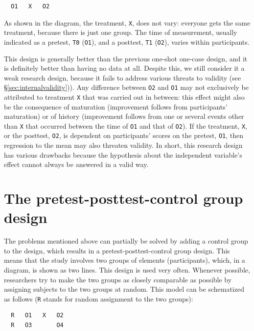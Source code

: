 \documentclass[
]{book}
\begin{document}
\begin{verbatim}
  O1   X   O2
\end{verbatim}

As shown in the diagram, the treatment, \texttt{X}, does not vary: everyone gets the same treatment, because there is just one group. The time of measurement, usually indicated as a pretest, \texttt{T0} (\texttt{O1}), and a posttest, \texttt{T1} (\texttt{O2}), varies within participants.

This design is generally better than the previous one-shot one-case design, and it is definitely better than having no data at all. Despite this, we still consider it a weak research design, because it fails to address various threats to validity (see §\ref{sec:internalvalidity})). Any difference between \texttt{O2} and \texttt{O1} may not exclusively be attributed to treatment \texttt{X} that was carried out in between: this effect might also be the consequence of maturation (improvement follows from participants' maturation) or of history (improvement follows from one or several events other than \texttt{X} that occurred between the time of \texttt{O1} and that of \texttt{O2}). If the treatment, \texttt{X}, or the posttest, \texttt{O2}, is dependent on participants' scores on the pretest, \texttt{O1}, then regression to the mean may also threaten validity. In short, this research design has various drawbacks because the hypothesis about the independent variable's effect cannot always be answered in a valid way.

\hypertarget{sec:pretest-posttest-control-group-design}{%
\section{The pretest-posttest-control group design}\label{sec:pretest-posttest-control-group-design}}

The problems mentioned above can partially be solved by adding a control group to the design, which results in a pretest-posttest-control group design. This means that the study involves two groups of elements (participants), which, in a diagram, is shown as two lines. This design is used very often. Whenever possible, researchers try to make the two groups as closely comparable as possible by assigning subjects to the two groups at random. This model can be schematized as follows (\texttt{R} stands for random assignment to the two groups):

\begin{verbatim}
  R   O1   X   O2
  R   O3       O4
\end{verbatim}
\end{document}
